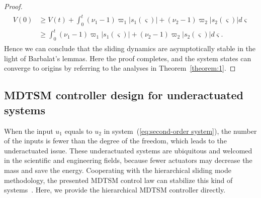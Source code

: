 \documentclass[3p]{elsarticle}
\theoremstyle{plain}
\theoremstyle{remark}
\begin{document}
{\begin{proof}
\begin{align}\begin{split}
V(0)&\ge V(t)+\int_0^t(\nu_1-1)\varpi_1\vert s_1(\varsigma)\vert+(\nu_2-1)\varpi_2\vert s_2(\varsigma)\vert d\varsigma\\
&\ge\int_0^t(\nu_1-1)\varpi_1\vert s_1(\varsigma)\vert+(\nu_2-1)\varpi_2\vert s_2(\varsigma)\vert d\varsigma.
\end{split}\end{align}
Hence we can conclude that the sliding dynamics are asymptotically stable in the light of Barbalat’s lemmas. Here the proof completes, and the system states can converge to origins by referring to the analyses in Theorem~\ref{theorem:1}.
\end{proof}
}
\subsection{MDTSM controller design for underactuated systems}
When the input $u_1$ equals to $u_2$ in system~(\ref{eq:second-order system}), the number of the inputs is fewer than the degree of the freedom, which leads to the underactuated issue. These underactuated systems are ubiquitous and welcomed in the scientific and engineering fields, because fewer actuators may decrease the mass and save the energy. Cooperating with the hierarchical sliding mode methodology, the presented MDTSM control law can stabilize this kind of systems~\cite{wang2004design}. Here, we provide the hierarchical MDTSM controller directly.
\end{document}

